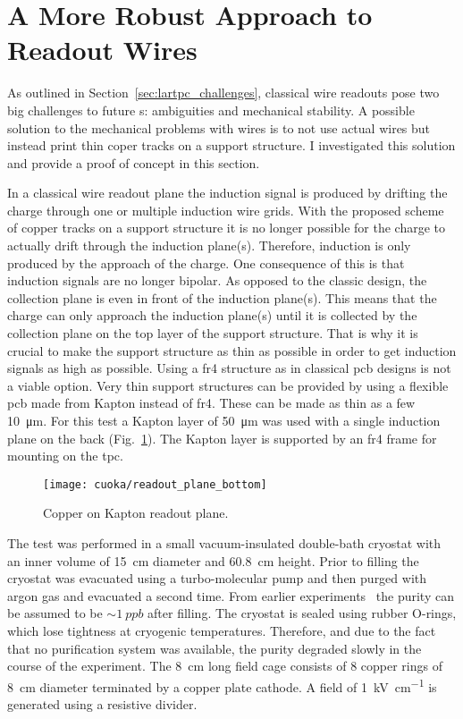 \section{A More Robust Approach to  Readout Wires}
\label{sec:studies_cuoka}

As outlined in Section~\ref{sec:lartpc_challenges}, classical wire readouts pose two big challenges to future \lartpc{}s: ambiguities and mechanical stability.
A possible solution to the mechanical problems with wires is to not use actual wires but instead print thin coper tracks on a support structure.
I investigated this solution and provide a proof of concept in this section.

In a classical wire readout plane the induction signal is produced by drifting the charge through one or multiple induction wire grids.
With the proposed scheme of copper tracks on a support structure it is no longer possible for the charge to actually drift through the induction plane(s).
Therefore, induction is only produced by the approach of the charge.
One consequence of this is that induction signals are no longer bipolar.
As opposed to the classic design, the collection plane is even in front of the induction plane(s).
This means that the charge can only approach the induction plane(s) until it is collected by the collection plane on the top layer of the support structure.
That is why it is crucial to make the support structure as thin as possible in order to get induction signals as high as possible.
Using a \gls{fr4} structure as in classical \gls{pcb} designs is not a viable option.
Very thin support structures can be provided by using a flexible \gls{pcb} made from Kapton instead of \gls{fr4}.
These can be made as thin as a few \SI{10}{\micro\metre}.
For this test a Kapton layer of \SI{50}{\micro\metre} was used with a single induction plane on the back (Fig.~\ref{fig:cuoka_readout-plane}).
The Kapton layer is supported by an \gls{fr4} frame for mounting on the \gls{tpc}.

\begin{figure}[htb]
	\centering
	\texttt{[image: cuoka/readout\_plane\_bottom]}
	\caption[Copper on Kapton readout plane]{%
		Copper on Kapton readout plane.
	}
	\label{fig:cuoka_readout-plane}
\end{figure}

The test was performed in a small vacuum-insulated double-bath cryostat with an inner volume of \SI{15}{\centi\metre} diameter and \SI{60.8}{\centi\metre} height.
Prior to filling the cryostat was evacuated using a turbo-molecular pump and then purged with argon gas and evacuated a second time.
From earlier experiments~\cite{2photonAbs} the purity can be assumed to be $\sim{\SI{1}{ppb}}$ after filling.
The cryostat is sealed using rubber O-rings, which lose tightness at cryogenic temperatures.
Therefore, and due to the fact that no purification system was available, the purity degraded slowly in the course of the experiment.
The \SI{8}{\centi\metre} long field cage consists of \num{8} copper rings of \SI{8}{\centi\metre} diameter terminated by a copper plate cathode.
A field of \SI{1}{\kilo\volt\per\centi\metre} is generated using a resistive divider.

